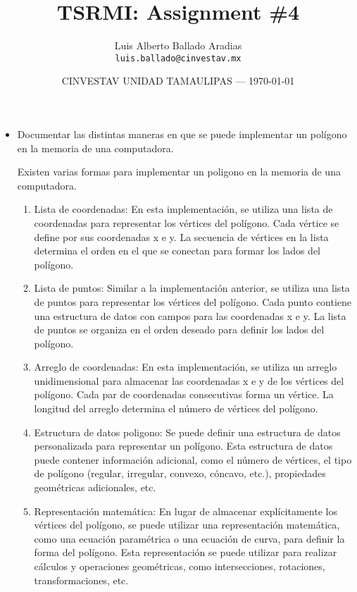 \documentclass{article}
\title{TSRMI: Assignment \#4} %
\author{Luis Alberto Ballado Aradias\\ \texttt{luis.ballado@cinvestav.mx}} %
\date{CINVESTAV UNIDAD TAMAULIPAS --- \today} %
\begin{document}
\maketitle %


\begin{itemize}
\item Documentar las distintas maneras en que se puede implementar un polígono en la memoria de una computadora.

  Existen varias formas para implementar un poligono en la memoria de una computadora.\\

  \begin{enumerate}
  \item Lista de coordenadas: En esta implementación, se utiliza una lista de coordenadas para representar los vértices del polígono. Cada vértice se define por sus coordenadas x e y. La secuencia de vértices en la lista determina el orden en el que se conectan para formar los lados del polígono.
  \item Lista de puntos: Similar a la implementación anterior, se utiliza una lista de puntos para representar los vértices del polígono. Cada punto contiene una estructura de datos con campos para las coordenadas x e y. La lista de puntos se organiza en el orden deseado para definir los lados del polígono.
  \item Arreglo de coordenadas: En esta implementación, se utiliza un arreglo unidimensional para almacenar las coordenadas x e y de los vértices del polígono. Cada par de coordenadas consecutivas forma un vértice. La longitud del arreglo determina el número de vértices del polígono.
  \item Estructura de datos poligono: Se puede definir una estructura de datos personalizada para representar un polígono. Esta estructura de datos puede contener información adicional, como el número de vértices, el tipo de polígono (regular, irregular, convexo, cóncavo, etc.), propiedades geométricas adicionales, etc.
  \item Representación matemática: En lugar de almacenar explícitamente los vértices del polígono, se puede utilizar una representación matemática, como una ecuación paramétrica o una ecuación de curva, para definir la forma del polígono. Esta representación se puede utilizar para realizar cálculos y operaciones geométricas, como intersecciones, rotaciones, transformaciones, etc. 
  \end{enumerate}


\end{itemize}
\end{document}
